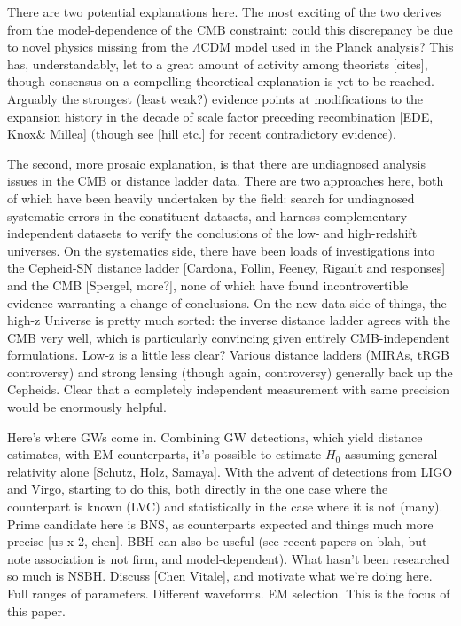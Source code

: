 \documentclass[%
 reprint,
 superscriptaddress,
 nofootinbib,
 amsmath,amssymb,
 aps,
]{revtex4-2}
\begin{document}
There are two potential explanations here. The most exciting of the two derives from the model-dependence of the CMB constraint: could this discrepancy be due to novel physics missing from the $\Lambda$CDM model used in the Planck analysis? This has, understandably, let to a great amount of activity among theorists [cites], though consensus on a compelling theoretical explanation is yet to be reached. Arguably the strongest (least weak?) evidence points at modifications to the expansion history in the decade of scale factor preceding recombination [EDE, Knox\& Millea] (though see [hill etc.] for recent contradictory evidence).

The second, more prosaic explanation, is that there are undiagnosed analysis issues in the CMB or distance ladder data. There are two approaches here, both of which have been heavily undertaken by the field: search for undiagnosed systematic errors in the constituent datasets, and harness complementary independent datasets to verify the conclusions of the low- and high-redshift universes. On the systematics side, there have been loads of investigations into the Cepheid-SN distance ladder [Cardona, Follin, Feeney, Rigault and responses] and the CMB [Spergel, more?], none of which have found incontrovertible evidence warranting a change of conclusions. On the new data side of things, the high-z Universe is pretty much sorted: the inverse distance ladder agrees with the CMB very well, which is particularly convincing given entirely CMB-independent formulations. Low-z is a little less clear? Various distance ladders (MIRAs, tRGB controversy) and strong lensing (though again, controversy) generally back up the Cepheids. Clear that a completely independent measurement with same precision would be enormously helpful.

Here's where GWs come in. Combining GW detections, which yield distance estimates, with EM counterparts, it's possible to estimate $H_0$ assuming general relativity alone [Schutz, Holz, Samaya]. With the advent of detections from LIGO and Virgo, starting to do this, both directly in the one case where the counterpart is known (LVC) and statistically in the case where it is not (many). Prime candidate here is BNS, as counterparts expected and things much more precise [us x 2, chen]. BBH can also be useful (see recent papers on blah, but note association is not firm, and model-dependent). What hasn't been researched so much is NSBH. Discuss [Chen Vitale], and motivate what we're doing here. Full ranges of parameters. Different waveforms. EM selection. This is the focus of this paper.
\end{document}
